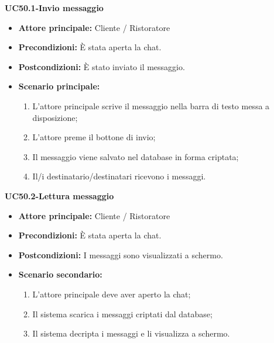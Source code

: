 \textbf{UC50.1-Invio messaggio}
\begin{itemize}
\item \textbf{Attore principale:} Cliente / Ristoratore
\item \textbf{Precondizioni:} È stata aperta la chat.
\item \textbf{Postcondizioni:} È stato inviato il messaggio.
\item \textbf{Scenario principale:}
\begin{enumerate}
    \item L'attore principale scrive il messaggio nella barra di testo messa a disposizione;
    \item L'attore preme il bottone di invio;
    \item Il messaggio viene salvato nel database in forma criptata;
    \item Il/i destinatario/destinatari ricevono i messaggi.
\end{enumerate}
\end{itemize}

\textbf{UC50.2-Lettura messaggio}
\begin{itemize}
\item \textbf{Attore principale:} Cliente / Ristoratore
\item \textbf{Precondizioni:} È stata aperta la chat.
\item \textbf{Postcondizioni:} I messaggi sono visualizzati a schermo.
\item \textbf{Scenario secondario:}
\begin{enumerate}
    \item L'attore principale deve aver aperto la chat;
    \item Il sistema scarica i messaggi criptati dal database;
    \item Il sistema decripta i messaggi e li visualizza a schermo.
\end{enumerate}
\end{itemize}
